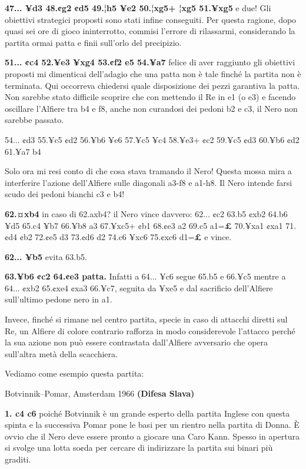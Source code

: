 \textbf{47... ¥d3 48.¢g2 ¢d5 49.¦h5 ¥e2 50.¦xg5+ ¦xg5 51.¥xg5} e due!
Gli obiettivi strategici proposti sono stati infine conseguiti. Per
questa ragione, dopo quasi sei ore di gioco ininterrotto, commisi
l'errore di rilassarmi, considerando la partita ormai patta e finii
sull'orlo del precipizio.

\textbf{51... ¢c4 52.¥e3 ¥xg4 53.¢f2 e5 54.¥a7} felice di aver raggiunto
gli obiettivi proposti mi dimenticai dell'adagio che una patta non è
tale finché la partita non è terminata. Qui occorreva chiedersi quale
disposizione dei pezzi garantiva la patta. Non sarebbe stato difficile
scoprire che con mettendo il Re in e1 (o e3) e facendo oscillare
l'Alfiere tra b4 e f8, anche non curandosi dei pedoni b2 e c3, il Nero
non sarebbe passato.

54... ¢d3 55.¥c5 ¢d2 56.¥b6 ¥e6 57.¥c5 ¥c4 58.¥e3+ ¢c2 59.¥c5 ¢d3 60.¥b6
¢d2 61.¥a7 b4


Solo ora mi resi conto di che cosa stava tramando il Nero! Questa mossa
mira a interferire l'azione dell'Alfiere sulle diagonali a3-f8 e a1-h8.
Il Nero intende farsi scudo dei pedoni bianchi c3 e b4!

\textbf{62.¤xb4} in caso di 62.axb4? il Nero vince davvero: 62... ¢c2
63.b5 ¢xb2 64.b6 ¥d5 65.c4 ¥b7 66.¥b8 a3 67.¥xc5+ ¢b1 68.¢e3 a2 69.c5
a1=\textbf{£} 70.¥xa1 ¢xa1 71.¢d4 ¢b2 72.¢e5 d3 73.¢d6 d2 74.c6 ¥xc6
75.¢xc6 d1=\textbf{£} e vince.

\textbf{62... ¥b5} evita 63.b5.

\textbf{63.¥b6 ¢c2 64.¢e3 patta.} Infatti a 64... ¥c6 segue 65.b5 e
66.¥c5 mentre a 64... ¢xb2 65.¢xe4 ¢xa3 66.¥c7, seguita da ¥xe5 e dal
sacrificio dell'Alfiere sull'ultimo pedone nero in a1.

Invece, finché si rimane nel centro partita, specie in caso di attacchi
diretti sul Re, un Alfiere di colore contrario rafforza in modo
considerevole l'attacco perché la sua azione non può essere contrastata
dall'Alfiere avversario che opera sull'altra metà della scacchiera.

Vediamo come esempio questa partita:

Botvinnik--Pomar, Amsterdam 1966 \textbf{(Difesa Slava)}

\textbf{1. c4 c6} poiché Botvinnik è un grande esperto della partita
Inglese con questa spinta e la successiva Pomar pone le basi per un
rientro nella partita di Donna. È ovvio che il Nero deve essere pronto a
giocare una Caro Kann. Spesso in apertura si svolge una lotta so¢da per
cercare di indirizzare la partita sui binari più graditi.

